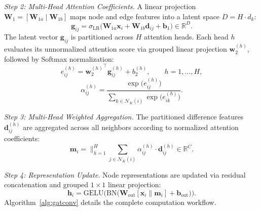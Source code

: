 \documentclass[]{interact}
\theoremstyle{plain}
\theoremstyle{definition}
\theoremstyle{remark}
\begin{document}
\textit{Step 2: Multi-Head Attention Coefficients.} A linear projection $\mathbf{W}_1 = [\mathbf{W}_{1a} \mid \mathbf{W}_{1b}]$ maps node and edge features into a latent space $D = H \cdot d_k$:
\begin{equation}
\mathbf{g}_{ij} = \sigma_{\text{LR}}\!\Big(\mathbf{W}_{1a}\mathbf{x}_i + \mathbf{W}_{1b}\mathbf{d}_{ij} + \mathbf{b}_1\Big) \in \mathbb{R}^{D}.
\label{eq:attn_hidden}
\end{equation}
The latent vector $\mathbf{g}_{ij}$ is partitioned across $H$ attention heads. Each head $h$ evaluates its unnormalized attention score via grouped linear projection $\mathbf{w}_2^{(h)}$, followed by Softmax normalization:
\begin{equation}
e_{ij}^{(h)} = {\mathbf{w}_2^{(h)}}^\top \mathbf{g}_{ij}^{(h)} + b_2^{(h)}, \qquad h = 1, \dots, H,
\label{eq:attn_logit}
\end{equation}
\begin{equation}
\alpha_{ij}^{(h)} = \frac{\exp\!\big(e_{ij}^{(h)}\big)}{\sum_{k \in \mathcal{N}_K(i)} \exp\!\big(e_{ik}^{(h)}\big)}.
\label{eq:softmax}
\end{equation}

\textit{Step 3: Multi-Head Weighted Aggregation.} The partitioned difference features $\mathbf{d}_{ij}^{(h)}$ are aggregated across all neighbors according to normalized attention coefficients:
\begin{equation}
\mathbf{m}_i = \bigg\|_{h=1}^{H} \sum_{j \in \mathcal{N}_K(i)} \alpha_{ij}^{(h)} \cdot \mathbf{d}_{ij}^{(h)} \in \mathbb{R}^{C}.
\label{eq:agg}
\end{equation}

\textit{Step 4: Representation Update.} Node representations are updated via residual concatenation and grouped $1 \times 1$ linear projection:
\begin{equation}
\mathbf{h}_i = \text{GELU}\!\Big(\text{BN}\!\big(\mathbf{W}_{\text{out}}[\mathbf{x}_i \parallel \mathbf{m}_i] + \mathbf{b}_{\text{out}}\big)\Big).
\label{eq:output}
\end{equation}
Algorithm~\ref{alg:gatconv} details the complete computation workflow.
\end{document}
